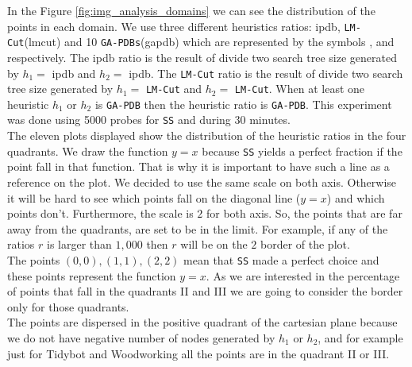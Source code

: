 In the Figure \ref{fig:img_analysis_domains} we can see the distribution of the points in each domain. We use three different heuristics ratios: ipdb, \texttt{LM-Cut}(lmcut) and 10 \texttt{GA-PDBs}(gapdb) which are represented by the symbols  ,  and  respectively. The ipdb ratio is the result of divide two search tree size generated by $h_{1} =$ ipdb and $h_{2} =$ ipdb. The \texttt{LM-Cut} ratio is the result of divide two search tree size generated by $h_{1} =$ \texttt{LM-Cut} and $h_{2} =$  \texttt{LM-Cut}. When at least one heuristic $h_{1}$ or $h_{2}$ is \texttt{GA-PDB} then the heuristic ratio is \texttt{GA-PDB}. This experiment was done using 5000 probes for \texttt{SS} and during 30 minutes.\\

The eleven plots displayed show  the distribution of the heuristic ratios in the four quadrants. We draw the function $y = x$ because \texttt{SS} yields a perfect fraction if the point fall in that function. That is why it is important to have such a line as a reference on the plot. We decided to use the same scale on both axis. Otherwise it will be hard to see which points fall on the diagonal line ($y = x$) and which points don't. Furthermore, the scale is $2$ for both axis. So, the points that are far away from the quadrants, are set to be in the limit. For example, if any of the ratios $r$ is larger than $1,000$ then $r$ will be on the $2$ border of the plot.\\

The points $(0,0), (1,1), (2,2)$ mean that \texttt{SS} made a perfect choice and these points represent the function $y = x$. As we are interested in the percentage of points that fall in the quadrants II and III we are going to consider the border only for those quadrants.\\

The points are dispersed in the positive quadrant of the cartesian plane because we do not have negative number of nodes generated by $h_{1}$ or $h_{2}$, and for example just for Tidybot and Woodworking all the points are in the quadrant II or III.

